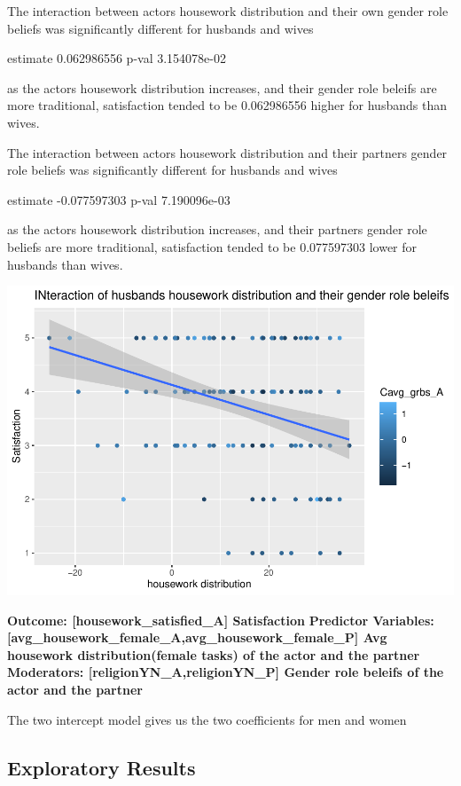 \documentclass[
  english,
  man,floatsintext]{apa6}
\begin{document}
The interaction between actors housework distribution and their own gender role beliefs was significantly different for husbands and wives

estimate 0.062986556
p-val 3.154078e-02

as the actors housework distribution increases, and their gender role beleifs are more traditional, satisfaction tended to be 0.062986556 higher for husbands than wives.

The interaction between actors housework distribution and their partners gender role beliefs was significantly different for husbands and wives

estimate -0.077597303
p-val 7.190096e-03

as the actors housework distribution increases, and their partners gender role beliefs are more traditional, satisfaction tended to be 0.077597303 lower for husbands than wives.

\includegraphics{results_files/figure-latex/unnamed-chunk-9-1.pdf}

\textbf{Outcome: {[}housework\_satisfied\_A{]} Satisfaction}
\textbf{Predictor Variables: {[}avg\_housework\_female\_A,avg\_housework\_female\_P{]} Avg} \textbf{housework distribution(female tasks) of the actor and the partner }
\textbf{Moderators: {[}religionYN\_A,religionYN\_P{]} Gender role beleifs of the actor and the partner }

The two intercept model gives us the two coefficients for men and women

\hypertarget{exploratory-results}{%
\subsection{Exploratory Results}\label{exploratory-results}}


\clearpage
\renewcommand{\listfigurename}{Figure captions}

\clearpage
\renewcommand{\listtablename}{Table captions}
\end{document}
